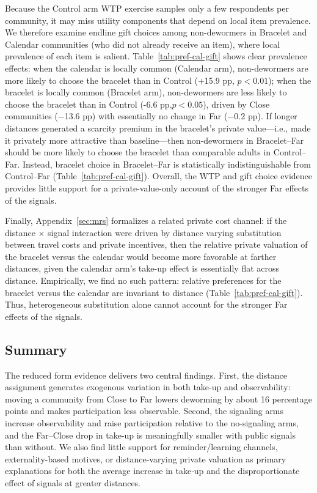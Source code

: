 \documentclass[12pt,a4paper]{article}
\begin{document}
Because the Control arm WTP exercise samples only a few respondents per community, it may miss utility components that depend on local item prevalence. We therefore examine endline gift choices among non-dewormers in Bracelet and Calendar communities (who did not already receive an item), where local prevalence of each item is salient. Table~\ref{tab:pref-cal-gift} shows clear prevalence effects: when the calendar is locally common (Calendar arm), non-dewormers are more likely to choose the bracelet than in Control (+15.9 pp, \(p<0.01\)); when the bracelet is locally common (Bracelet arm), non-dewormers are less likely to choose the bracelet than in Control (-6.6 pp,\(p<0.05\)), driven by Close communities (−13.6 pp) with essentially no change in Far (−0.2 pp). If longer distances generated a scarcity premium in the bracelet's private value---i.e., made it privately more attractive than baseline---then non-dewormers in Bracelet--Far should be more likely to choose the bracelet than comparable adults in Control--Far. Instead, bracelet choice in Bracelet--Far is statistically indistinguishable from Control--Far (Table~\ref{tab:pref-cal-gift}). Overall, the WTP and gift choice evidence provides little support for a private-value-only account of the stronger Far effects of the signals.

Finally, Appendix~\ref{sec:mrs} formalizes a related private cost channel: if the distance $\times$ signal interaction were driven by distance varying substitution between travel costs and private incentives, then the relative private valuation of the bracelet versus the calendar would become more favorable at farther distances, given the calendar arm's take-up effect is essentially flat across distance. Empirically, we find no such pattern: relative preferences for the bracelet versus the calendar are invariant to distance (Table~\ref{tab:pref-cal-gift}). Thus, heterogeneous substitution alone cannot account for the stronger Far effects of the signals.


\subsection{Summary}

The reduced form evidence delivers two central findings. First, the distance assignment generates exogenous variation in both take-up and observability: moving a community from Close to Far lowers deworming by about 16 percentage points and makes participation less observable. Second, the signaling arms increase observability and raise participation relative to the no-signaling arms, and the Far--Close drop in take-up is meaningfully smaller with public signals than without. We also find little support for reminder/learning channels, externality-based motives, or distance-varying private valuation as primary explanations for both the average increase in take‑up and the disproportionate effect of signals at greater distances.
\end{document}
